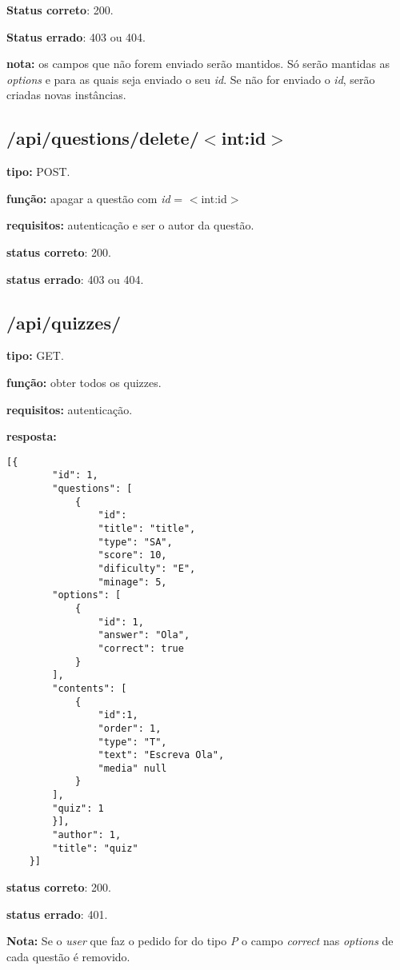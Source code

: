 \documentclass[11pt,a4paper]{report}
\begin{document}
\textbf{Status correto}: 200.

\textbf{Status errado}: 403 ou 404.

\textbf{nota:} os campos que não forem enviado serão mantidos. Só serão mantidas as \emph{options} e  para as quais seja enviado o seu \emph{id}. Se não for enviado o \emph{id}, serão criadas novas instâncias. 

\subsection{/api/questions/delete/$<$int:id$>$}

\textbf{tipo:} POST.

\textbf{função:} apagar a questão com \emph{id} = $<$int:id$>$

\textbf{requisitos:} autenticação e ser o autor da questão.

\textbf{status correto}: 200.

\textbf{status errado}: 403 ou 404.


\subsection{/api/quizzes/}

\textbf{tipo:} GET.

\textbf{função:} obter todos os quizzes.

\textbf{requisitos:} autenticação.

\textbf{resposta:}

\begin{lstlisting}[style = code]
    [{
		"id": 1,
		"questions": [
			{
                "id":
                "title": "title",
                "type": "SA",
                "score": 10,
                "dificulty": "E",
                "minage": 5,
        "options": [
            {
                "id": 1,
                "answer": "Ola",
                "correct": true
            }
        ],
        "contents": [
            {
                "id":1,
                "order": 1,
                "type": "T",
                "text": "Escreva Ola",
                "media" null
            }
        ],
        "quiz": 1
        }], 
	    "author": 1,
	    "title": "quiz"
    }]
\end{lstlisting}

\textbf{status correto}: 200.

\textbf{status errado}: 401.

\textbf{Nota:} Se o \emph{user} que faz o pedido for do tipo \emph{P} o campo \emph{correct} nas \emph{options} de cada questão é removido.
\end{document}
